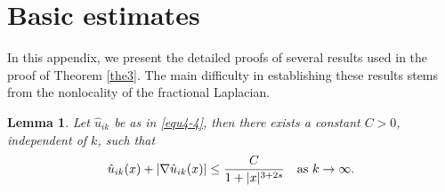\documentclass[reqno, 11pt]{amsart} %
\numberwithin{equation}{section}
\newtheorem{lemma}[theorem]{Lemma}
\begin{document}
	
	
	
	
	
	
	
	
	
	
	
	
	
	
	
	
	
	
	
	
	
	
	
	
	
	
	
	
	
	
	
	
	
	\appendix
	
	\section{Basic estimates} 
	In this appendix, we present the detailed proofs of several results used in the proof of Theorem \ref{the3}. The main difficulty in establishing these results stems from the nonlocality of the fractional Laplacian.
	\begin{lemma}\label{lem5-1}
		Let $\hat{u}_{ik}$ be as in \eqref{equ4-4}, then there exists a constant $C>0$, independent of $k$, such that
		\begin{equation}\label{equ5-1}
			\hat{u}_{ik}(x)+	|\nabla\hat{u}_{ik}(x)|\leq\frac{C}{1+|x|^{3+2s}}\quad \hbox{as $k\rightarrow\infty$}.
		\end{equation}
	\end{lemma}
\end{document}
